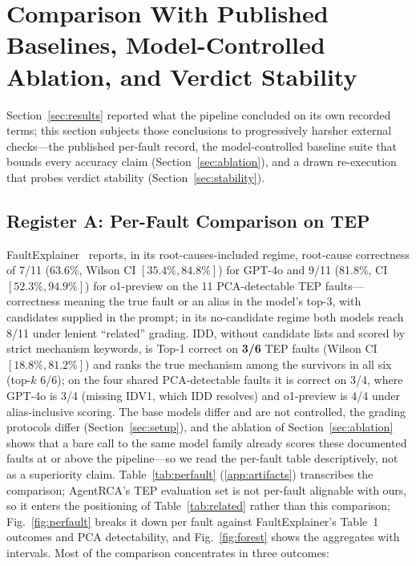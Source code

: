 \documentclass[preprint,12pt]{elsarticle}
\begin{document}
\section{Comparison With Published Baselines, Model-Controlled Ablation, and Verdict Stability}
\label{sec:comparison}

Section~\ref{sec:results} reported what the pipeline concluded on its own recorded terms; this section subjects those conclusions to progressively harsher external checks---the published per-fault record, the model-controlled baseline suite that bounds every accuracy claim (Section~\ref{sec:ablation}), and a drawn re-execution that probes verdict stability (Section~\ref{sec:stability}).

\subsection{Register A: Per-Fault Comparison on TEP}
FaultExplainer~\cite{khan2024faultexplainer} reports, in its root-causes-included regime, root-cause correctness of 7/11 (63.6\%, Wilson CI $[35.4\%,84.8\%]$) for GPT-4o and 9/11 (81.8\%, CI $[52.3\%,94.9\%]$) for o1-preview on the 11 PCA-detectable TEP faults---correctness meaning the true fault or an alias in the model's top-3, with candidates supplied in the prompt; in its no-candidate regime both models reach 8/11 under lenient ``related'' grading. IDD, without candidate lists and scored by strict mechanism keywords, is Top-1 correct on \textbf{3/6} TEP faults (Wilson CI $[18.8\%,81.2\%]$) and ranks the true mechanism among the survivors in all six (top-$k$ 6/6); on the four shared PCA-detectable faults it is correct on 3/4, where GPT-4o is 3/4 (missing IDV1, which IDD resolves) and o1-preview is 4/4 under alias-inclusive scoring. The base models differ and are not controlled, the grading protocols differ (Section~\ref{sec:setup}), and the ablation of Section~\ref{sec:ablation} shows that a bare call to the same model family already scores these documented faults at or above the pipeline---so we read the per-fault table descriptively, not as a superiority claim. Table~\ref{tab:perfault} (\ref{app:artifacts}) transcribes the comparison; AgentRCA's TEP evaluation set is not per-fault alignable with ours, so it enters the positioning of Table~\ref{tab:related} rather than this comparison; Fig.~\ref{fig:perfault} breaks it down per fault against FaultExplainer's Table~1 outcomes and PCA detectability, and Fig.~\ref{fig:forest} shows the aggregates with intervals. Most of the comparison concentrates in three outcomes:
\end{document}
